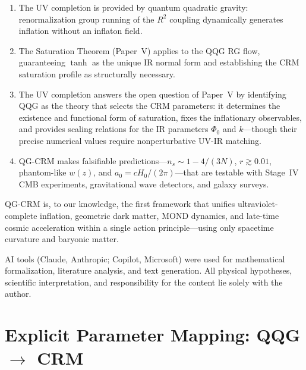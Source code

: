 \documentclass[aps,prd,twocolumn,superscriptaddress,nofootinbib]{revtex4-2}
\begin{document}
\begin{enumerate}
\item The UV completion is provided by quantum quadratic gravity: renormalization group running of the $R^2$ coupling dynamically generates inflation without an inflaton field.

\item The Saturation Theorem (Paper~V) applies to the QQG RG flow, guaranteeing $\tanh$ as the unique IR normal form and establishing the CRM saturation profile as structurally necessary.

\item The UV completion answers the open question of Paper~V by identifying QQG as the theory that selects the CRM parameters: it determines the existence and functional form of saturation, fixes the inflationary observables, and provides scaling relations for the IR parameters $\Phi_0$ and $k$---though their precise numerical values require nonperturbative UV-IR matching.

\item QG-CRM makes falsifiable predictions---$n_s \sim 1 - 4/(3N)$, $r \gtrsim 0.01$, phantom-like $w(z)$, and $a_0 = cH_0/(2\pi)$---that are testable with Stage~IV CMB experiments, gravitational wave detectors, and galaxy surveys.
\end{enumerate}

QG-CRM is, to our knowledge, the first framework that unifies ultraviolet-complete inflation, geometric dark matter, MOND dynamics, and late-time cosmic acceleration within a single action principle---using only spacetime curvature and baryonic matter.


\begin{acknowledgments}
AI tools (Claude, Anthropic; Copilot, Microsoft) were used for mathematical formalization, literature analysis, and text generation. All physical hypotheses, scientific interpretation, and responsibility for the content lie solely with the author.
\end{acknowledgments}


\appendix

\section{Explicit Parameter Mapping: QQG $\to$ CRM}
\label{app:parameter-mapping}
\end{document}
